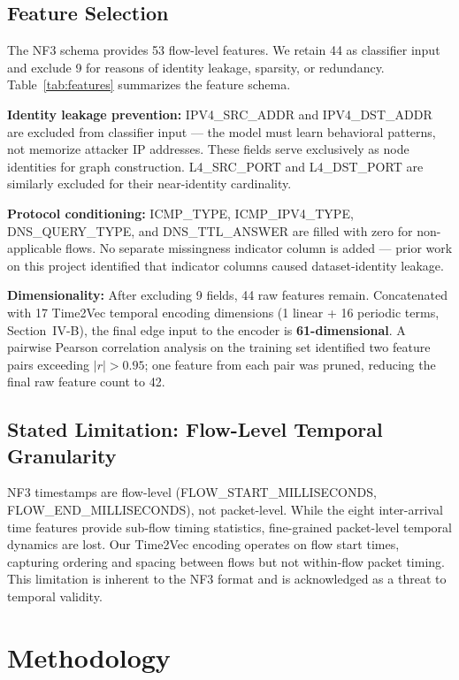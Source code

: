 \documentclass[compsoc,journal]{IEEEtran}
\begin{document}
\subsection{Feature Selection}

The NF3 schema provides 53 flow-level features. We retain 44 as classifier input and exclude 9 for reasons of identity leakage, sparsity, or redundancy. Table~\ref{tab:features} summarizes the feature schema.

\textbf{Identity leakage prevention:} IPV4\_SRC\_ADDR and IPV4\_DST\_ADDR are excluded from classifier input — the model must learn behavioral patterns, not memorize attacker IP addresses. These fields serve exclusively as node identities for graph construction. L4\_SRC\_PORT and L4\_DST\_PORT are similarly excluded for their near-identity cardinality.

\textbf{Protocol conditioning:} ICMP\_TYPE, ICMP\_IPV4\_TYPE, DNS\_QUERY\_TYPE, and DNS\_TTL\_ANSWER are filled with zero for non-applicable flows. No separate missingness indicator column is added — prior work on this project identified that indicator columns caused dataset-identity leakage.

\textbf{Dimensionality:} After excluding 9 fields, 44 raw features remain. Concatenated with 17 Time2Vec temporal encoding dimensions (1 linear + 16 periodic terms, Section~IV-B), the final edge input to the encoder is \textbf{61-dimensional}. A pairwise Pearson correlation analysis on the training set identified two feature pairs exceeding $|r| > 0.95$; one feature from each pair was pruned, reducing the final raw feature count to 42.

\subsection{Stated Limitation: Flow-Level Temporal Granularity}

NF3 timestamps are flow-level (FLOW\_START\_MILLISECONDS, FLOW\_END\_MILLISECONDS), not packet-level. While the eight inter-arrival time features provide sub-flow timing statistics, fine-grained packet-level temporal dynamics are lost. Our Time2Vec encoding operates on flow start times, capturing ordering and spacing between flows but not within-flow packet timing. This limitation is inherent to the NF3 format and is acknowledged as a threat to temporal validity.

\section{Methodology}
\end{document}
